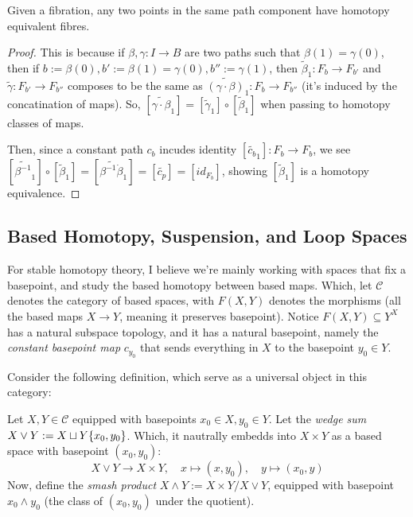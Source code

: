 \documentclass{article}
\begin{document}
\begin{cor}
    Given a fibration, any two points in the same path component have homotopy equivalent fibres.
\end{cor}
\begin{proof}
    This is because if $\beta,\gamma:I\rightarrow B$ are two paths such that $\beta(1)=\gamma(0)$, then if $b:= \beta(0), b':= \beta(1)=\gamma(0), b'':=\gamma(1)$, then $\tilde{\beta}_1:F_b\rightarrow F_{b'}$ and $\tilde{\gamma}:F_{b'}\rightarrow F_{b''}$ composes to be the same as $\tilde{(\gamma\cdot \beta)}_1:F_b\rightarrow F_{b''}$ (it's induced by the concatination of maps). So, $[\tilde{\gamma\cdot \beta}_1] = [\tilde{\gamma}_1]\circ [\tilde{\beta}_1]$ when passing to homotopy classes of maps.

    Then, since a constant path $c_b$ incudes identity $[\tilde{c_b}_1]:F_b\rightarrow F_b$, we see $[\tilde{\beta^{-1}}_1]\circ [\tilde{\beta}_1]=[\tilde{\beta^{-1}\dot \beta}_1] = [\tilde{c_p}] = [id_{F_b}]$, showing $[\tilde{\beta}_1]$ is a homotopy equivalence.
\end{proof}

\newpage

\subsection{Based Homotopy, Suspension, and Loop Spaces}

For stable homotopy theory, I believe we're mainly working with spaces that fix a basepoint, and study the based homotopy between based maps. Which, let $\mathcal{C}$ denotes the category of based spaces, with $F(X,Y)$ denotes the morphisms (all the based maps $X\rightarrow Y$, meaning it preserves basepoint). Notice $F(X,Y)\subseteq Y^X$ has a natural subspace topology, and it has a natural basepoint, namely the \emph{constant basepoint map} $c_{y_0}$ that sends everything in $X$ to the basepoint $y_0\in Y$.

Consider the following definition, which serve as a universal object in this category:
\begin{defn}
    Let $X,Y\in\mathcal{C}$ equipped with basepoints $x_0\in X,y_0\in Y$. Let the \emph{wedge sum} $X\vee Y:= X\sqcup Y\/\{x_0,y_0\}$. Which, it nautrally embedds into $X\times Y$ as a based space with basepoint $(x_0,y_0)$:
    \[X\vee Y\rightarrow X\times Y,\quad x\mapsto (x,y_0),\quad y\mapsto (x_0,y)\]
    Now, define the \emph{smash product} $X\wedge Y:= X\times Y/X\vee Y$, equipped with basepoint $x_0\wedge y_0$ (the class of $(x_0,y_0)$ under the quotient).
\end{defn}
\end{document}
